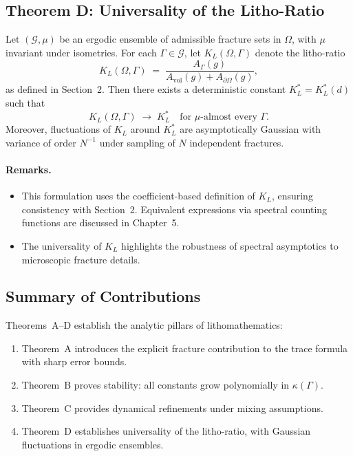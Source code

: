\subsection{Theorem D: Universality of the Litho-Ratio}

\begin{theoremD}[Universality of $K_L$]
Let $(\mathcal{G},\mu)$ be an ergodic ensemble of admissible fracture sets
in $\Omega$, with $\mu$ invariant under isometries. For each $\Gamma\in\mathcal{G}$,
let $K_L(\Omega,\Gamma)$ denote the litho-ratio
\[
K_L(\Omega,\Gamma) \;=\; \frac{A_\Gamma(g)}{A_{\mathrm{vol}}(g)+A_{\partial\Omega}(g)} ,
\]
as defined in Section~2. Then there exists a deterministic constant
$K_L^\ast=K_L^\ast(d)$ such that
\[
K_L(\Omega,\Gamma) \;\to\; K_L^\ast \quad \text{for $\mu$-almost every $\Gamma$}.
\]
Moreover, fluctuations of $K_L$ around $K_L^\ast$ are asymptotically Gaussian
with variance of order $N^{-1}$ under sampling of $N$ independent fractures.
\end{theoremD}

\paragraph{Remarks.}
\begin{itemize}
  \item This formulation uses the coefficient-based definition of $K_L$,
  ensuring consistency with Section~2. Equivalent expressions via spectral
  counting functions are discussed in Chapter~5.
  \item The universality of $K_L$ highlights the robustness of spectral
  asymptotics to microscopic fracture details.
\end{itemize}

\subsection{Summary of Contributions}

Theorems~A–D establish the analytic pillars of lithomathematics:

\begin{enumerate}
  \item Theorem~A introduces the explicit fracture contribution to the trace
  formula with sharp error bounds.
  \item Theorem~B proves stability: all constants grow polynomially in
  $\kappa(\Gamma)$.
  \item Theorem~C provides dynamical refinements under mixing assumptions.
  \item Theorem~D establishes universality of the litho-ratio, with Gaussian
  fluctuations in ergodic ensembles.
\end{enumerate}

